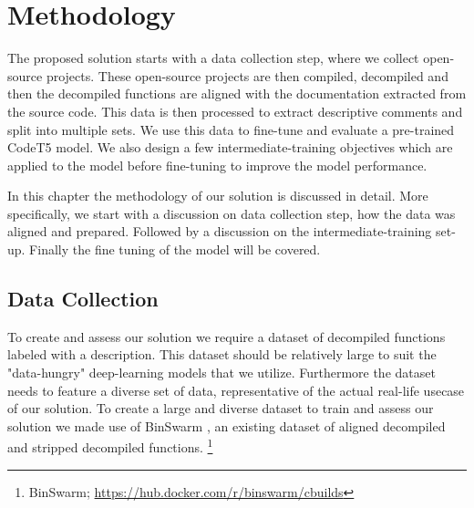 \chapter{Methodology}
\label{methodology}

The proposed solution starts with a data collection step, where we collect open-source projects. These open-source projects are then compiled, decompiled and then the decompiled functions are aligned with the documentation extracted from the source code. This data is then processed to extract descriptive comments and split into multiple sets. We use this data to fine-tune and evaluate a pre-trained CodeT5 model. We also design a few intermediate-training objectives which are applied to the model before fine-tuning to improve the model performance. 

In this chapter the methodology of our solution is discussed in detail. More specifically, we start with a discussion on data collection step, how the data was aligned and prepared. Followed by a discussion on the intermediate-training set-up. Finally the fine tuning of the model will be covered.

\section{Data Collection}
To create and assess our solution we require a dataset of decompiled functions labeled with a description. This dataset should be relatively large to suit the "data-hungry" deep-learning models that we utilize. Furthermore the dataset needs to feature a diverse set of data, representative of the actual real-life usecase of our solution. 
To create a large and diverse dataset to train and assess our solution we made use of BinSwarm \cite{InlinedFunc}, an existing dataset of aligned decompiled and stripped decompiled functions. \footnote{BinSwarm; \url{https://hub.docker.com/r/binswarm/cbuilds}}

